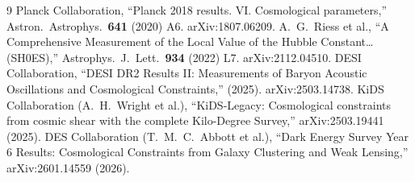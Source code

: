 \documentclass[12pt,a4paper,twoside]{article}
\theoremstyle{plain}
\theoremstyle{definition}
\theoremstyle{remark}
\begin{document}
\begin{thebibliography}{9}
Planck Collaboration, ``Planck 2018 results. VI. Cosmological parameters,'' Astron.\ Astrophys.\ \textbf{641} (2020) A6. arXiv:1807.06209.
A.~G.~Riess et al., ``A Comprehensive Measurement of the Local Value of the Hubble Constant\ldots (SH0ES),'' Astrophys.\ J.\ Lett.\ \textbf{934} (2022) L7. arXiv:2112.04510.
DESI Collaboration, ``DESI DR2 Results II: Measurements of Baryon Acoustic Oscillations and Cosmological Constraints,'' (2025). arXiv:2503.14738.
KiDS Collaboration (A.~H.~Wright et al.), ``KiDS-Legacy: Cosmological constraints from cosmic shear with the complete Kilo-Degree Survey,'' arXiv:2503.19441 (2025).
DES Collaboration (T.~M.~C.~Abbott et al.), ``Dark Energy Survey Year 6 Results: Cosmological Constraints from Galaxy Clustering and Weak Lensing,'' arXiv:2601.14559 (2026).


\end{thebibliography}
\end{document}
